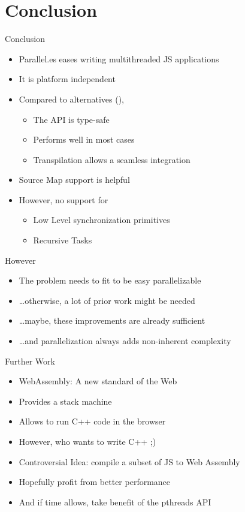 \section{Conclusion}
\begin{frame}{Conclusion}
	\begin{itemize}
		\item Parallel.es eases writing multithreaded JS applications
		\item It is platform independent
		\item Compared to alternatives (\cite{hamstersjs,SavitzkyMayr2016, Wermke2016}), 
		\begin{itemize}
			\item The API is type-safe
			\item Performs well in most cases
			\item Transpilation allows a seamless integration
		\end{itemize}
		\item Source Map support is helpful
		\item However, no support for
			\begin{itemize}
				\item Low Level synchronization primitives
				\item Recursive Tasks
			\end{itemize}
	\end{itemize}
\end{frame}

\begin{frame}{However}
	\begin{itemize}[<+->]
		\item The problem needs to fit to be easy parallelizable
		\item \dots otherwise, a lot of prior work might be needed
		\item \dots maybe, these improvements are already sufficient
		\item \dots and parallelization always adds non-inherent complexity 
	\end{itemize}
\end{frame}

\begin{frame}{Further Work}
	\begin{itemize}[<+->]
		\item WebAssembly: A new standard of the Web
		\item Provides a stack machine 
		\item Allows to run C++ code in the browser
		\item However, who wants to write C++ ;)
		\item Controversial Idea: compile a subset of JS to Web Assembly
		\item Hopefully profit from better performance
		\item And if time allows, take benefit of the pthreads API
	\end{itemize}
\end{frame}

